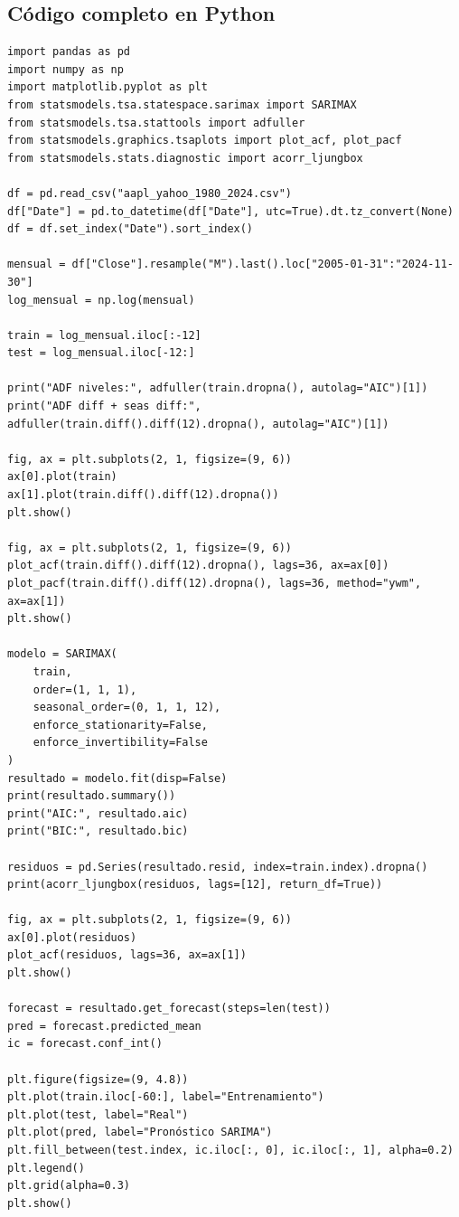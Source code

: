 \documentclass[12pt,a4paper]{article}
\begin{document}
\subsection{Código completo en Python}
\begin{lstlisting}[style=pythonstyle,caption={Ejemplo 3: SARIMA con componente estacional}]
import pandas as pd
import numpy as np
import matplotlib.pyplot as plt
from statsmodels.tsa.statespace.sarimax import SARIMAX
from statsmodels.tsa.stattools import adfuller
from statsmodels.graphics.tsaplots import plot_acf, plot_pacf
from statsmodels.stats.diagnostic import acorr_ljungbox

df = pd.read_csv("aapl_yahoo_1980_2024.csv")
df["Date"] = pd.to_datetime(df["Date"], utc=True).dt.tz_convert(None)
df = df.set_index("Date").sort_index()

mensual = df["Close"].resample("M").last().loc["2005-01-31":"2024-11-30"]
log_mensual = np.log(mensual)

train = log_mensual.iloc[:-12]
test = log_mensual.iloc[-12:]

print("ADF niveles:", adfuller(train.dropna(), autolag="AIC")[1])
print("ADF diff + seas diff:", adfuller(train.diff().diff(12).dropna(), autolag="AIC")[1])

fig, ax = plt.subplots(2, 1, figsize=(9, 6))
ax[0].plot(train)
ax[1].plot(train.diff().diff(12).dropna())
plt.show()

fig, ax = plt.subplots(2, 1, figsize=(9, 6))
plot_acf(train.diff().diff(12).dropna(), lags=36, ax=ax[0])
plot_pacf(train.diff().diff(12).dropna(), lags=36, method="ywm", ax=ax[1])
plt.show()

modelo = SARIMAX(
    train,
    order=(1, 1, 1),
    seasonal_order=(0, 1, 1, 12),
    enforce_stationarity=False,
    enforce_invertibility=False
)
resultado = modelo.fit(disp=False)
print(resultado.summary())
print("AIC:", resultado.aic)
print("BIC:", resultado.bic)

residuos = pd.Series(resultado.resid, index=train.index).dropna()
print(acorr_ljungbox(residuos, lags=[12], return_df=True))

fig, ax = plt.subplots(2, 1, figsize=(9, 6))
ax[0].plot(residuos)
plot_acf(residuos, lags=36, ax=ax[1])
plt.show()

forecast = resultado.get_forecast(steps=len(test))
pred = forecast.predicted_mean
ic = forecast.conf_int()

plt.figure(figsize=(9, 4.8))
plt.plot(train.iloc[-60:], label="Entrenamiento")
plt.plot(test, label="Real")
plt.plot(pred, label="Pronóstico SARIMA")
plt.fill_between(test.index, ic.iloc[:, 0], ic.iloc[:, 1], alpha=0.2)
plt.legend()
plt.grid(alpha=0.3)
plt.show()
\end{lstlisting}
\end{document}
